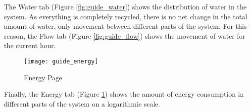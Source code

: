 The Water tab (Figure \ref{fig:guide_water}) shows the distribution of water in the system. As everything is completely recycled, there is no net change in the total amount of water, only movement between different parts of the system. For this reason, the Flow tab (Figure \ref{fig:guide_flow}) shows the movement of water for the current hour.

\begin{figure}[h]
    \centering
    \texttt{[image: guide\_energy]}
    \caption{Energy Page}
    \label{fig:guide_energy}
\end{figure}

Finally, the Energy tab (Figure \ref{fig:guide_energy}) shows the amount of energy consumption in different parts of the system on a logarithmic scale.
